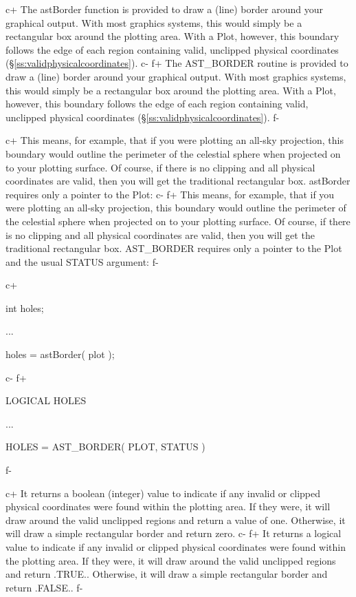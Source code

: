\documentclass[twoside,11pt]{starlink}
\providecommand{\secref}[1]{\S\ref{#1}}
\begin{document}
c+
The astBorder function is provided to draw a (line) border around your
graphical output. With most graphics systems, this would simply be a
rectangular box around the plotting area. With a Plot, however, this
boundary follows the edge of each region containing valid, unclipped
physical coordinates (\secref{ss:validphysicalcoordinates}).
c-
f+
The AST\_BORDER routine is provided to draw a (line) border around
your graphical output. With most graphics systems, this would simply
be a rectangular box around the plotting area. With a Plot, however,
this boundary follows the edge of each region containing valid,
unclipped physical coordinates (\secref{ss:validphysicalcoordinates}).
f-

c+
This means, for example, that if you were plotting an all-sky
projection, this boundary would outline the perimeter of the celestial
sphere when projected on to your plotting surface. Of course, if there
is no clipping and all physical coordinates are valid, then you will
get the traditional rectangular box. astBorder requires only
a pointer to the Plot:
c-
f+
This means, for example, that if you were plotting an all-sky
projection, this boundary would outline the perimeter of the celestial
sphere when projected on to your plotting surface. Of course, if there
is no clipping and all physical coordinates are valid, then you will
get the traditional rectangular box. AST\_BORDER requires only a
pointer to the Plot and the usual STATUS argument:
f-

c+
\small
\begin{terminalv}
int holes;

...

holes = astBorder( plot );
\end{terminalv}
\normalsize
c-
f+
\small
\begin{terminalv}
      LOGICAL HOLES

      ...

      HOLES = AST_BORDER( PLOT, STATUS )
\end{terminalv}
\normalsize
f-

c+
It returns a boolean (integer) value to indicate if any invalid or
clipped physical coordinates were found within the plotting area. If
they were, it will draw around the valid unclipped regions and return
a value of one.  Otherwise, it will draw a simple rectangular border
and return zero.
c-
f+
It returns a logical value to indicate if any invalid or clipped
physical coordinates were found within the plotting area. If they
were, it will draw around the valid unclipped regions and return
.TRUE.. Otherwise, it will draw a simple rectangular border and return
.FALSE..
f-
\end{document}
